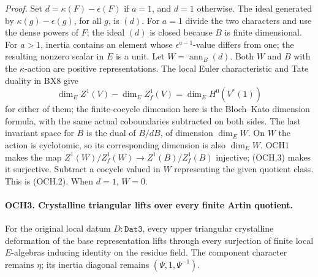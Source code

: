 \documentclass[11pt,a4paper]{article}
\numberwithin{equation}{section}
\theoremstyle{remark}\newtheorem{remark}[theorem]{Remark}
\begin{document}
\emph{Proof.}
Set \(d=\kappa(F)-\epsilon(F)\) if \(a=1\), and \(d=1\)
otherwise.  The ideal generated by
\(\kappa(g)-\epsilon(g)\), for all \(g\), is \((d)\).
For \(a=1\) divide the two characters and use the dense powers of
\(F\); the ideal \((d)\) is closed because \(B\) is finite
 dimensional.  For \(a>1\), inertia contains an element whose
\(\epsilon^{a-1}\)-value differs from one; the resulting nonzero
scalar in \(E\) is a unit.
Let \(W=\operatorname{ann}_B(d)\).  Both \(W\) and \(B\)
with the \(\kappa\)-action are positive representations.  The
local Euler characteristic and Tate duality in BX8 give
\[
 \dim_E Z^1(V)-\dim_E Z^1_f(V)
       =\dim_E H^0(V^*(1))
 \tag{OCH.3}
\]
for either of them; the finite-cocycle dimension here is the
Bloch--Kato dimension formula, with the same actual coboundaries
subtracted on both sides.  The last invariant space for \(B\)
is the dual of \(B/dB\), of dimension \(\dim_E W\).
On \(W\) the action is cyclotomic, so its corresponding dimension
is also \(\dim_E W\).  OCH1 makes the map
\(Z^1(W)/Z^1_f(W)\to Z^1(B)/Z^1_f(B)\) injective;
(OCH.3) makes it surjective.  Subtract a cocycle valued in \(W\)
representing the given quotient class.  This is (OCH.2).
When \(d=1\), \(W=0\).

\paragraph{OCH3. Crystalline triangular lifts over every finite Artin quotient.}
\label{claim:OCH3}
For the original local datum \(D:\texttt{Dat3}\), every upper
triangular crystalline deformation of the base representation lifts
through every surjection of finite local \(E\)-algebras inducing
identity on the residue field.  The component character remains
\(\eta\); its inertia diagonal remains
\((\Psi,1,\Psi^{-1})\).
\end{document}
